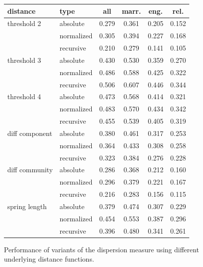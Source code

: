 \documentclass{sigchi}
\begin{document}
\begin{figure}
\begin{center}
\begin{tabular}{|l|l|c|c|c|c|}
\hline
distance & type & all & marr. & eng. & rel. \\ \hline \hline
threshold 2 & absolute & 0.279 & 0.361 & 0.205 & 0.152 \\ \hline 
  & normalized & 0.305 & 0.394 & 0.227 & 0.168 \\ \hline 
  & recursive & 0.210 & 0.279 & 0.141 & 0.105 \\ \hline 
\hline
threshold 3 & absolute & 0.430 & 0.530 & 0.359 & 0.270 \\ \hline 
  & normalized & 0.486 & 0.588 & 0.425 & 0.322 \\ \hline 
  & recursive & 0.506 & 0.607 & 0.446 & 0.344 \\ \hline 
\hline
threshold 4 & absolute & 0.473 & 0.568 & 0.414 & 0.321 \\ \hline 
  & normalized & 0.483 & 0.570 & 0.434 & 0.342 \\ \hline 
  & recursive & 0.455 & 0.539 & 0.405 & 0.319 \\ \hline 
\hline
diff component & absolute & 0.380 & 0.461 & 0.317 & 0.253 \\ \hline 
  & normalized & 0.364 & 0.433 & 0.308 & 0.258 \\ \hline 
  & recursive & 0.323 & 0.384 & 0.276 & 0.228 \\ \hline 
\hline
diff community & absolute & 0.286 & 0.368 & 0.212 & 0.160 \\ \hline 
  & normalized & 0.296 & 0.379 & 0.221 & 0.167 \\ \hline 
  & recursive & 0.216 & 0.283 & 0.156 & 0.115 \\ \hline 
\hline
spring length & absolute & 0.379 & 0.474 & 0.307 & 0.229 \\ \hline 
  & normalized & 0.454 & 0.553 & 0.387 & 0.296 \\ \hline 
  & recursive & 0.396 & 0.480 & 0.341 & 0.261 \\ \hline 
\hline
\end{tabular}
\end{center}
\caption{Performance of variants of the dispersion measure using different underlying distance functions.  \label{tab:full-dispersion}}
\end{figure}

\end{document}
